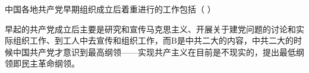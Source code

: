 \question 中国各地共产党早期组织成立后着重进行的工作包括（ ）
\par{}
\begin{solution}早起的共产党成立后主要是研究和宣传马克思主义、开展关于建党问题的讨论和实际组织工作、到工人中去宣传和组织工作，而B是中共二大的内容，中共二大的时候中国共产党才意识到最高纲领------实现共产主义在目前是不现实的，提出最低纲领即民主革命纲领。
\end{solution}
